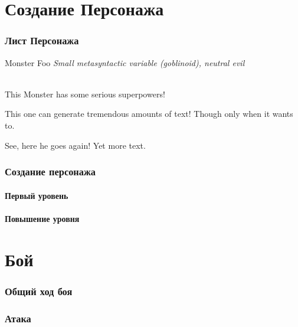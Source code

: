 \documentclass[10pt,twoside,twocolumn,openany]{book}
\begin{document}
\selectfont
\tableofcontents

\part{Создание Персонажа}
\section{Лист Персонажа}
\begin{monsterbox}{Monster Foo}
	\textit{Small metasyntactic variable (goblinoid), neutral evil}\\
	\hline
	\basics[armorclass = 12, hitpoints = 16 (3d8+3), speed = 50 ft]
	\hline
	\stats[STR = \stat{2}, DEX = \stat{1}]
	\hline
	\details[languages = {Common Lisp, Erlang},]
	\hline \\[1mm]
	\begin{monsteraction}
		This Monster has some serious superpowers!
	\end{monsteraction}
	\begin{monsteraction}
		This one can generate tremendous amounts of text! Though only when it wants to.
	\end{monsteraction}
	\begin{monsteraction}
		See, here he goes again! Yet more text.
	\end{monsteraction}
\end{monsterbox}

\section{Создание персонажа}
\lipsum[1]
\subsection{Первый уровень}
\lipsum[1]
\subsection{Повышение уровня}
\lipsum[1]

\part{Бой}
\section{Общий ход боя}
\lipsum[1]
\section{Атака}
\lipsum[1]
\end{document}

